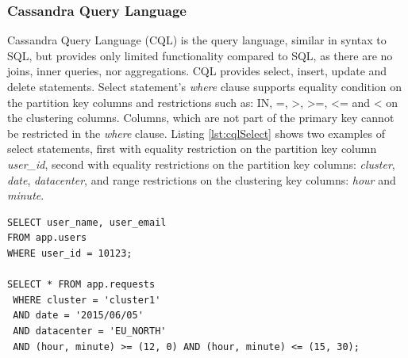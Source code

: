 

\subsubsection{Cassandra Query Language}
\label{sec:theory:cassandra:cql}
Cassandra Query Language (CQL) is the query language, similar in syntax to SQL, but provides only limited functionality compared to SQL, as there are no joins, inner queries, nor aggregations. CQL provides select, insert, update and delete statements. Select statement's \emph{where} clause supports equality condition on the partition key columns and restrictions such as: IN, =, >, >=, <= and < on the clustering columns. Columns, which are not part of the primary key cannot be restricted in the \emph{where} clause. Listing \ref{lst:cqlSelect} shows two examples of select statements, first with equality restriction on the partition key column \emph{user_id}, second with equality restrictions on the partition key columns: \emph{cluster}, \emph{date}, \emph{datacenter}, and range restrictions on the clustering key columns: \emph{hour} and \emph{minute}.

\begin{lstlisting}[style=outcode,label={lst:cqlSelect},caption={Examples of CQL select statements}]
SELECT user_name, user_email 
FROM app.users 
WHERE user_id = 10123;
    
SELECT * FROM app.requests
 WHERE cluster = 'cluster1'
 AND date = '2015/06/05'
 AND datacenter = 'EU_NORTH'
 AND (hour, minute) >= (12, 0) AND (hour, minute) <= (15, 30);
\end{lstlisting}

 
